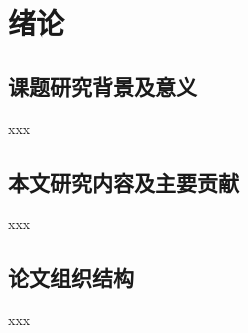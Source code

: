 \chapter{绪论}
\vspace{7pt}

\section{课题研究背景及意义}
xxx\cite{shu-ju-yao-su-shi-chang-pei-zhi}

\section{本文研究内容及主要贡献}
xxx

\section{论文组织结构}
xxx
